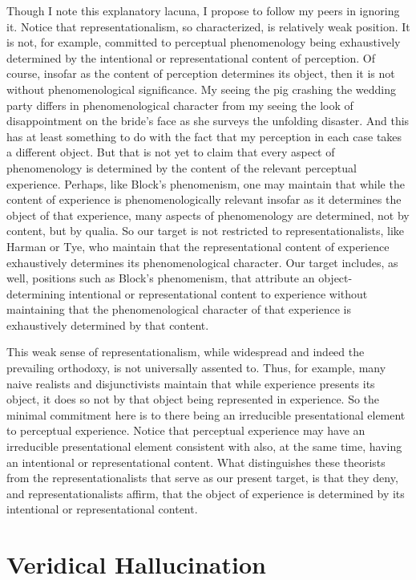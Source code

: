 \documentclass[12pt]{article}
\begin{document}
Though I note this explanatory lacuna, I propose to follow my peers in ignoring it. Notice that representationalism, so characterized, is relatively weak position. It is not, for example, committed to perceptual phenomenology being exhaustively determined by the intentional or representational content of perception. Of course, insofar as the content of perception determines its object, then it is not without phenomenological significance. My seeing the pig crashing the wedding party differs in phenomenological character from my seeing the look of disappointment on the bride's face as she surveys the unfolding disaster.  And this has at least something to do with the fact that my perception in each case takes a different object. But that is not yet to claim that every aspect of phenomenology is determined by the content of the relevant perceptual experience. Perhaps, like Block's phenomenism, one may maintain that while the content of experience is phenomenologically relevant insofar as it determines the object of that experience, many aspects of phenomenology are determined, not by content, but by qualia. So our target is not restricted to representationalists, like Harman or Tye, who maintain that the representational content of experience exhaustively determines its phenomenological character. Our target includes, as well, positions such as Block's phenomenism, that attribute an object-determining intentional or representational content to experience without maintaining that the phenomenological character of that experience is exhaustively determined by that content.

This weak sense of representationalism, while widespread and indeed the prevailing orthodoxy, is not universally assented to. Thus, for example, many naive realists and disjunctivists maintain that while experience presents its object, it does so not by that object being represented in experience. So the minimal commitment here is to there being an irreducible presentational element to perceptual experience. Notice that perceptual experience may have an irreducible presentational element consistent with also, at the same time, having an intentional or representational content. What distinguishes these theorists from the representationalists that serve as our present target, is that they deny, and representationalists affirm, that the object of experience is determined by its intentional or representational content.


\section{Veridical Hallucination} %
\label{sec:veridical_hallucination}
\end{document}

